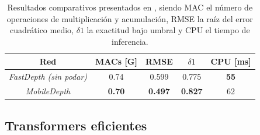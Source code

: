 \documentclass[a4paper]{article}
\newcommand{\textbfit}[1]{\textbf{\textit{#1}}}
\begin{document}
\begin{itemize}
    \begin{table}[H]
    \centering
    \begin{tabular}{@{}ccccc@{}}
    \toprule
    Red                            & MACs {[}G{]}  & RMSE           & $\delta1$ & CPU {[}ms{]} \\ \midrule
    \textit{FastDepth (sin podar)} & 0.74          & 0.599          & 0.775                  & \textbf{55}  \\
    \textit{MobileDepth}           & \textbf{0.70} & \textbf{0.497} & \textbf{0.827}         & 62           \\ \bottomrule
    \end{tabular}
    \caption{Resultados comparativos presentados en \cite{wang2020mobiledepth}, siendo MAC el número de operaciones de multiplicación y acumulación, RMSE la raíz del error cuadrático medio, $\delta1$ la exactitud bajo umbral \cite{depth-estimation-metrics} y CPU el tiempo de inferencia.}
    \label{tab:comparacion-fastdepth-mobile-depth}
    \end{table}
    
\end{itemize}

\subsection{Transformers eficientes}\label{transformers-eficientes}
\end{document}
